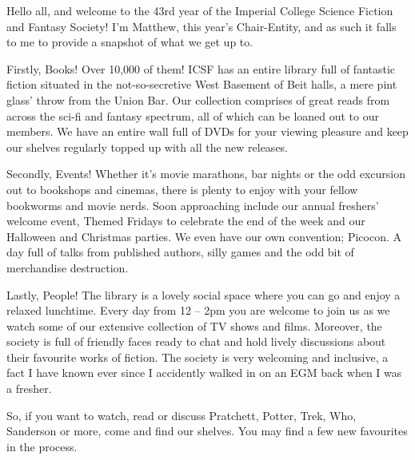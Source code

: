 Hello all, and welcome to the 43rd year of the Imperial College
Science Fiction and Fantasy Society!  I’m Matthew, this year’s
Chair-Entity, and as such it falls to me to provide a snapshot of what
we get up to.

Firstly, Books! Over 10,000 of them! ICSF has an entire library full
of fantastic fiction situated in the not-so-secretive West Basement of
Beit halls, a mere pint glass’ throw from the Union Bar.\footnotemark
Our collection comprises of great reads from across the sci-fi and
fantasy spectrum, all of which can be loaned out to our members. We
have an entire wall full of DVDs for your viewing pleasure and keep
our shelves regularly topped up with all the new releases.

Secondly, Events! Whether it’s movie marathons, bar nights or the odd
excursion out to bookshops and cinemas, there is plenty to enjoy with
your fellow bookworms and movie nerds. Soon approaching include our
annual freshers’ welcome event, Themed Fridays to celebrate the end of
the week and our Halloween and Christmas parties. We even have our own
convention; Picocon. A day full of talks from published authors, silly
games and the odd bit of merchandise destruction.

Lastly, People! The library is a lovely social space where you can go
and enjoy a relaxed lunchtime.  Every day from 12 – 2pm you are
welcome to join us as we watch some of our extensive collection of TV
shows and films. Moreover, the society is full of friendly faces ready
to chat and hold lively discussions about their favourite works of
fiction. The society is very welcoming and inclusive, a fact I have
known ever since I accidently walked in on an EGM back when I was a
fresher.

So, if you want to watch, read or discuss Pratchett, Potter, Trek,
Who, Sanderson or more, come and find our shelves. You may find a few
new favourites in the process.
